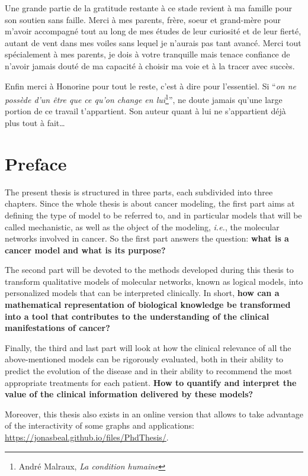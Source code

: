 \documentclass[a4paper,12pt,twoside,onecolumn,openright,final,oldfontcommands]{memoir}
\newcommand{\initial}[1]{
	\lettrine[lines=3,lhang=0.33,nindent=0em]{
		\color{gray}
     		{\textsc{#1}}}{}}
\newcommand{\clearemptydoublepage}{\newpage{\thispagestyle{empty}\cleardoublepage}}
\begin{document}
Une grande partie de la gratitude restante à ce stade revient à ma
famille pour son soutien sans faille. Merci à mes parents, frère, soeur
et grand-mère pour m'avoir accompagné tout au long de mes études de leur
curiosité et de leur fierté, autant de vent dans mes voiles sans lequel
je n'aurais pas tant avancé. Merci tout spécialement à mes parents, je
dois à votre tranquille mais tenace confiance de n'avoir jamais douté de
ma capacité à choisir ma voie et à la tracer avec succès.

Enfin merci à Honorine pour tout le reste, c'est à dire pour
l'essentiel. Si ``\emph{on ne possède d'un être que ce qu'on change en
lui}\footnote{André Malraux, \emph{La condition humaine}}'', ne doute
jamais qu'une large portion de ce travail t'appartient. Son auteur quant
à lui ne s'appartient déjà plus tout à fait\ldots{}

\clearemptydoublepage

\chapter*{Preface}

\initial{T}he present thesis is structured in three parts, each
subdivided into three chapters. Since the whole thesis is about cancer
modeling, the first part aims at defining the type of model to be
referred to, and in particular models that will be called mechanistic,
as well as the object of the modeling, \emph{i.e.}, the molecular
networks involved in cancer. So the first part answers the question:
\textbf{what is a cancer model and what is its purpose?}

The second part will be devoted to the methods developed during this
thesis to transform qualitative models of molecular networks, known as
logical models, into personalized models that can be interpreted
clinically. In short, \textbf{how can a mathematical representation of
biological knowledge be transformed into a tool that contributes to the
understanding of the clinical manifestations of cancer?}

Finally, the third and last part will look at how the clinical relevance
of all the above-mentioned models can be rigorously evaluated, both in
their ability to predict the evolution of the disease and in their
ability to recommend the most appropriate treatments for each patient.
\textbf{How to quantify and interpret the value of the clinical
information delivered by these models?}

Moreover, this thesis also exists in an online version that allows to
take advantage of the interactivity of some graphs and applications:
\url{https://jonasbeal.github.io/files/PhdThesis/}.
\end{document}
